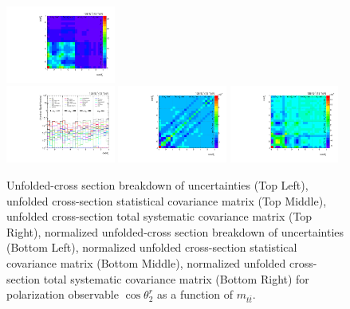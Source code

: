 \begin{refsection}
\begin{figure}[htb]
\begin{center}
 \includegraphics[width=0.32\textwidth]{fig_fullRun2UL/unfolding/combined/TotalSystCovMatrix_rebinnedB_b2r_mttbar.pdf} \\
 \includegraphics[width=0.32\textwidth]{fig_fullRun2UL/unfolding/combined/deltaSystCombinedlogNorm_rebinnedB_b2r_mttbar.pdf}
 \includegraphics[width=0.32\textwidth]{fig_fullRun2UL/unfolding/combined/StatCovMatrixNorm_rebinnedB_b2r_mttbar.pdf}
 \includegraphics[width=0.32\textwidth]{fig_fullRun2UL/unfolding/combined/TotalSystCovMatrixNorm_rebinnedB_b2r_mttbar.pdf} \\
\caption{Unfolded-cross section breakdown of uncertainties (Top Left), unfolded cross-section statistical covariance matrix (Top Middle), unfolded cross-section total systematic covariance matrix (Top Right), normalized unfolded-cross section breakdown of uncertainties (Bottom Left), normalized unfolded cross-section statistical covariance matrix (Bottom Middle), normalized unfolded cross-section total systematic covariance matrix (Bottom Right) for polarization observable $\cos\theta_{2}^{r}$ as a function of $m_{t\bar{t}}$.}
\label{fig:b2r_mttbar_uncertainties}
\end{center}
\end{figure}
\clearpage

\end{refsection}
